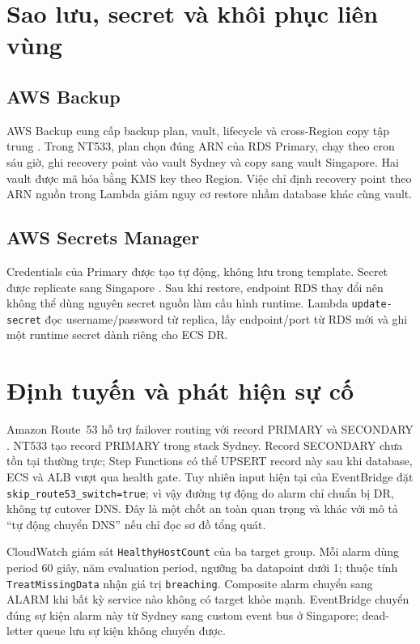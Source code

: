 \section{Sao lưu, secret và khôi phục liên vùng}

\subsection{AWS Backup}

AWS Backup cung cấp backup plan, vault, lifecycle và cross-Region copy tập trung \cite{aws-backup-cross-region}. Trong NT533, plan chọn đúng ARN của RDS Primary, chạy theo cron sáu giờ, ghi recovery point vào vault Sydney và copy sang vault Singapore. Hai vault được mã hóa bằng KMS key theo Region. Việc chỉ định recovery point theo ARN nguồn trong Lambda giảm nguy cơ restore nhầm database khác cùng vault.

\subsection{AWS Secrets Manager}

Credentials của Primary được tạo tự động, không lưu trong template. Secret được replicate sang Singapore \cite{aws-secrets-replication}. Sau khi restore, endpoint RDS thay đổi nên không thể dùng nguyên secret nguồn làm cấu hình runtime. Lambda \texttt{update-secret} đọc username/password từ replica, lấy endpoint/port từ RDS mới và ghi một runtime secret dành riêng cho ECS DR.

\section{Định tuyến và phát hiện sự cố}

Amazon Route~53 hỗ trợ failover routing với record PRIMARY và SECONDARY \cite{aws-route53-failover}. NT533 tạo record PRIMARY trong stack Sydney. Record SECONDARY chưa tồn tại thường trực; Step Functions có thể UPSERT record này sau khi database, ECS và ALB vượt qua health gate. Tuy nhiên input hiện tại của EventBridge đặt \texttt{skip\_route53\_switch=true}; vì vậy đường tự động do alarm chỉ chuẩn bị DR, không tự cutover DNS. Đây là một chốt an toàn quan trọng và khác với mô tả ``tự động chuyển DNS'' nếu chỉ đọc sơ đồ tổng quát.

CloudWatch giám sát \texttt{HealthyHostCount} của ba target group. Mỗi alarm dùng period 60 giây, năm evaluation period, ngưỡng ba datapoint dưới 1; thuộc tính \texttt{TreatMissingData} nhận giá trị \texttt{breaching}. Composite alarm chuyển sang ALARM khi bất kỳ service nào không có target khỏe mạnh. EventBridge chuyển đúng sự kiện alarm này từ Sydney sang custom event bus ở Singapore; dead-letter queue lưu sự kiện không chuyển được.

